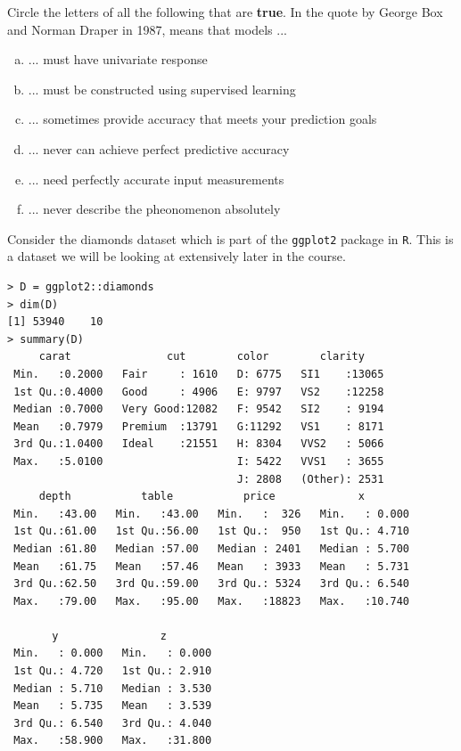 \documentclass[12pt]{article}
\begin{document}
 Circle the letters of all the following that are \textbf{true}. In the quote by George Box and Norman Draper in 1987,  means that models ...


\begin{enumerate}[(a)]
\item ... must have univariate response
\item ... must be constructed using supervised learning
\item ... sometimes provide accuracy that meets your prediction goals
\item ... never can achieve perfect predictive accuracy
\item ... need perfectly accurate input measurements
\item ... never describe the pheonomenon absolutely
\end{enumerate}

\eenum


\problem Consider the diamonds dataset which is part of the \texttt{ggplot2} package in \texttt{R}. This is a dataset we will be looking at extensively later in the course.

\begin{lstlisting}
> D = ggplot2::diamonds
> dim(D)
[1] 53940    10
> summary(D)
     carat               cut        color        clarity     
 Min.   :0.2000   Fair     : 1610   D: 6775   SI1    :13065  
 1st Qu.:0.4000   Good     : 4906   E: 9797   VS2    :12258  
 Median :0.7000   Very Good:12082   F: 9542   SI2    : 9194  
 Mean   :0.7979   Premium  :13791   G:11292   VS1    : 8171  
 3rd Qu.:1.0400   Ideal    :21551   H: 8304   VVS2   : 5066  
 Max.   :5.0100                     I: 5422   VVS1   : 3655  
                                    J: 2808   (Other): 2531  
     depth           table           price             x         
 Min.   :43.00   Min.   :43.00   Min.   :  326   Min.   : 0.000  
 1st Qu.:61.00   1st Qu.:56.00   1st Qu.:  950   1st Qu.: 4.710  
 Median :61.80   Median :57.00   Median : 2401   Median : 5.700  
 Mean   :61.75   Mean   :57.46   Mean   : 3933   Mean   : 5.731  
 3rd Qu.:62.50   3rd Qu.:59.00   3rd Qu.: 5324   3rd Qu.: 6.540  
 Max.   :79.00   Max.   :95.00   Max.   :18823   Max.   :10.740  
                                                                 
       y                z         
 Min.   : 0.000   Min.   : 0.000  
 1st Qu.: 4.720   1st Qu.: 2.910  
 Median : 5.710   Median : 3.530  
 Mean   : 5.735   Mean   : 3.539  
 3rd Qu.: 6.540   3rd Qu.: 4.040  
 Max.   :58.900   Max.   :31.800
\end{lstlisting}
\end{document}
